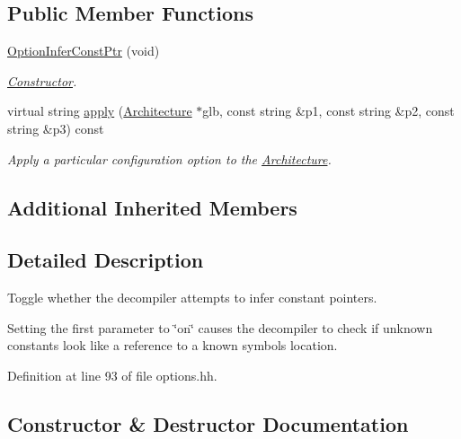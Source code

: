 \subsection*{Public Member Functions}
\begin{DoxyCompactItemize}
\item 
\mbox{\hyperlink{class_option_infer_const_ptr_a64f9ee32161c170735c3b9208414fc00}{Option\+Infer\+Const\+Ptr}} (void)
\begin{DoxyCompactList}\small\item\em \mbox{\hyperlink{class_constructor}{Constructor}}. \end{DoxyCompactList}\item 
virtual string \mbox{\hyperlink{class_option_infer_const_ptr_adc43210baf04d8e5fe13977502f56a69}{apply}} (\mbox{\hyperlink{class_architecture}{Architecture}} $\ast$glb, const string \&p1, const string \&p2, const string \&p3) const
\begin{DoxyCompactList}\small\item\em Apply a particular configuration option to the \mbox{\hyperlink{class_architecture}{Architecture}}. \end{DoxyCompactList}\end{DoxyCompactItemize}
\subsection*{Additional Inherited Members}


\subsection{Detailed Description}
Toggle whether the decompiler attempts to infer constant pointers. 

Setting the first parameter to \char`\"{}on\char`\"{} causes the decompiler to check if unknown constants look like a reference to a known symbol\textquotesingle{}s location. 

Definition at line 93 of file options.\+hh.



\subsection{Constructor \& Destructor Documentation}
\mbox{\label{class_option_infer_const_ptr_a64f9ee32161c170735c3b9208414fc00}} 
